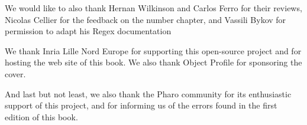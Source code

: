 \documentclass[a4paper,10pt,twoside]{book}
\begin{document}
We would like to also thank Hernan Wilkinson and Carlos Ferro for their reviews, Nicolas Cellier for the feedback on the number chapter, and Vassili Bykov for permission to adapt his Regex documentation

We thank Inria Lille Nord Europe for supporting this open-source project and for hosting the web site of this book. We also thank Object Profile for sponsoring the cover.

And last but not least, we also thank the Pharo community for its enthusiastic support of this project, and for informing us of the errors found in the first edition of this book.



\ifx\wholebook\relax\else
   
   
\end{document}
